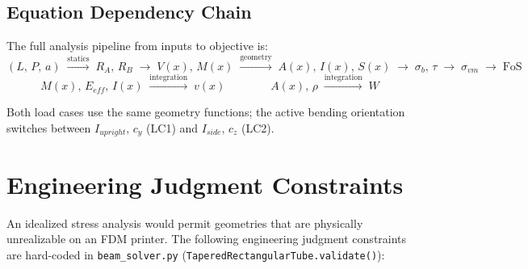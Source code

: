 \documentclass[11pt,letterpaper]{article}
\begin{document}
\subsection{Equation Dependency Chain}

The full analysis pipeline from inputs to objective is:
\[
  (L,\,P,\,a)
  \;\xrightarrow{\text{statics}}\;
  R_A,\,R_B
  \;\xrightarrow{}\;
  V(x),\,M(x)
  \;\xrightarrow{\text{geometry}}\;
  A(x),\,I(x),\,S(x)
  \;\xrightarrow{}\;
  \sigma_b,\,\tau
  \;\xrightarrow{}\;
  \sigma_{vm}
  \;\xrightarrow{}\;
  \mathrm{FoS}
\]
\[
  M(x),\,E_{eff},\,I(x)
  \;\xrightarrow{\text{integration}}\;
  v(x)
  \qquad\qquad
  A(x),\,\rho
  \;\xrightarrow{\text{integration}}\;
  W
\]

Both load cases use the same geometry functions; the active bending
orientation switches between $I_{upright},\,c_y$ (LC1) and $I_{side},\,c_z$ (LC2).


\section{Engineering Judgment Constraints}
\label{sec:constraints}

An idealized stress analysis would permit geometries that are physically
unrealizable on an FDM printer.  The following engineering judgment constraints
are hard-coded in \texttt{beam\_solver.py} (\texttt{TaperedRectangularTube.validate()}):
\end{document}
